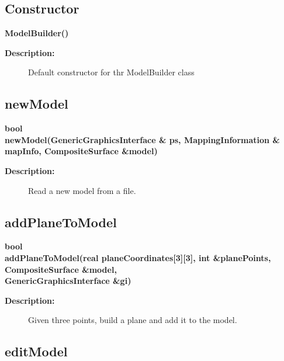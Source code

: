 \subsection{Constructor}
 
\newlength{\ModelBuilderIncludeArgIndent}
\begin{flushleft} \textbf{%
\settowidth{\ModelBuilderIncludeArgIndent}{ModelBuilder(}%
ModelBuilder() 
}\end{flushleft}
\begin{description}
\item[{\bf Description:}] 
     Default constructor for thr ModelBuilder class
\end{description}
\subsection{newModel}
 
\begin{flushleft} \textbf{%
bool  \\ 
\settowidth{\ModelBuilderIncludeArgIndent}{newModel(}%
newModel(GenericGraphicsInterface \& ps, MappingInformation \& mapInfo, CompositeSurface \&model)
}\end{flushleft}
\begin{description}
\item[{\bf Description:}] 
    Read a new model from a file.
\end{description}
\subsection{addPlaneToModel}
 
\begin{flushleft} \textbf{%
bool  \\ 
\settowidth{\ModelBuilderIncludeArgIndent}{addPlaneToModel(}%
addPlaneToModel(real planeCoordinates[3][3], int \&planePoints, CompositeSurface \&model, \\ 
\hspace{\ModelBuilderIncludeArgIndent}GenericGraphicsInterface \&gi)
}\end{flushleft}
\begin{description}
\item[{\bf Description:}] 
    Given three points, build a plane and add it to the model.
\end{description}
\subsection{editModel}
 
